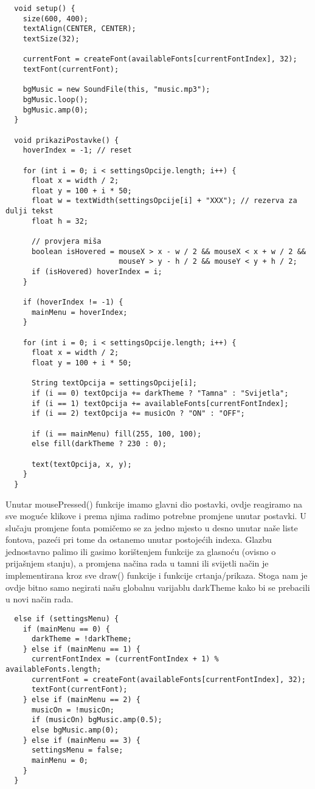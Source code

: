 \documentclass{article}
\begin{document}
\begin{verbatim}    
  void setup() {
    size(600, 400);
    textAlign(CENTER, CENTER);
    textSize(32);
    
    currentFont = createFont(availableFonts[currentFontIndex], 32);
    textFont(currentFont);

    bgMusic = new SoundFile(this, "music.mp3"); 
    bgMusic.loop();
    bgMusic.amp(0); 
  }

  void prikaziPostavke() {
    hoverIndex = -1; // reset

    for (int i = 0; i < settingsOpcije.length; i++) {
      float x = width / 2;
      float y = 100 + i * 50;
      float w = textWidth(settingsOpcije[i] + "XXX"); // rezerva za dulji tekst
      float h = 32;

      // provjera miša
      boolean isHovered = mouseX > x - w / 2 && mouseX < x + w / 2 &&
                          mouseY > y - h / 2 && mouseY < y + h / 2;
      if (isHovered) hoverIndex = i;
    }

    if (hoverIndex != -1) {
      mainMenu = hoverIndex;
    }

    for (int i = 0; i < settingsOpcije.length; i++) {
      float x = width / 2;
      float y = 100 + i * 50;

      String textOpcija = settingsOpcije[i];
      if (i == 0) textOpcija += darkTheme ? "Tamna" : "Svijetla";
      if (i == 1) textOpcija += availableFonts[currentFontIndex];
      if (i == 2) textOpcija += musicOn ? "ON" : "OFF";

      if (i == mainMenu) fill(255, 100, 100); 
      else fill(darkTheme ? 230 : 0);

      text(textOpcija, x, y);
    }
  }
\end{verbatim}

Unutar mousePressed() funkcije imamo glavni dio postavki, ovdje reagiramo na sve moguće klikove i prema njima radimo potrebne promjene unutar postavki.
U slučaju promjene fonta pomičemo se za jedno mjesto u desno unutar naše liste fontova, pazeći pri tome da ostanemo unutar postojećih indexa. Glazbu jednostavno palimo ili gasimo korištenjem funkcije za glasnoću (ovisno o prijašnjem stanju), a promjena načina rada u tamni ili svijetli način je implementirana kroz sve draw() funkcije i funkcije crtanja/prikaza.
Stoga nam je ovdje bitno samo negirati našu globalnu varijablu darkTheme kako bi se prebacili u novi način rada.

\begin{verbatim} 
  else if (settingsMenu) {
    if (mainMenu == 0) {
      darkTheme = !darkTheme;
    } else if (mainMenu == 1) {
      currentFontIndex = (currentFontIndex + 1) % availableFonts.length;
      currentFont = createFont(availableFonts[currentFontIndex], 32);
      textFont(currentFont);
    } else if (mainMenu == 2) {
      musicOn = !musicOn;
      if (musicOn) bgMusic.amp(0.5);
      else bgMusic.amp(0);
    } else if (mainMenu == 3) {
      settingsMenu = false;
      mainMenu = 0;
    }
  }
\end{verbatim}
\end{document}
